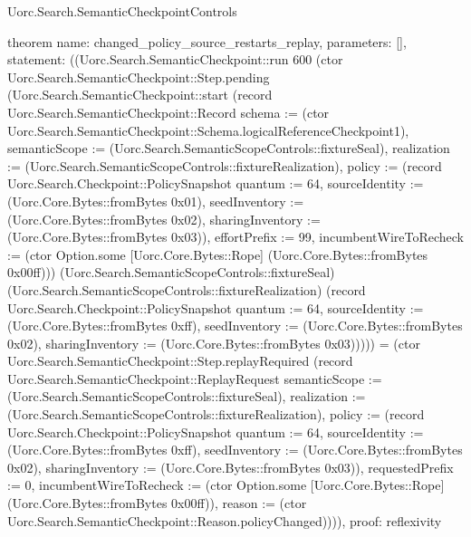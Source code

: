 \begin{lexlean}{Uorc.Search.SemanticCheckpointControls}
\begin{semanticmodule}
theorem{
  name: changed_policy_source_restarts_replay,
  parameters: [],
  statement: ((Uorc.Search.SemanticCheckpoint::run 600 (ctor Uorc.Search.SemanticCheckpoint::Step.pending (Uorc.Search.SemanticCheckpoint::start (record Uorc.Search.SemanticCheckpoint::Record {schema := (ctor Uorc.Search.SemanticCheckpoint::Schema.logicalReferenceCheckpoint1), semanticScope := (Uorc.Search.SemanticScopeControls::fixtureSeal), realization := (Uorc.Search.SemanticScopeControls::fixtureRealization), policy := (record Uorc.Search.Checkpoint::PolicySnapshot {quantum := 64, sourceIdentity := (Uorc.Core.Bytes::fromBytes 0x01), seedInventory := (Uorc.Core.Bytes::fromBytes 0x02), sharingInventory := (Uorc.Core.Bytes::fromBytes 0x03)}), effortPrefix := 99, incumbentWireToRecheck := (ctor Option.some [Uorc.Core.Bytes::Rope] (Uorc.Core.Bytes::fromBytes 0x00ff))}) (Uorc.Search.SemanticScopeControls::fixtureSeal) (Uorc.Search.SemanticScopeControls::fixtureRealization) (record Uorc.Search.Checkpoint::PolicySnapshot {quantum := 64, sourceIdentity := (Uorc.Core.Bytes::fromBytes 0xff), seedInventory := (Uorc.Core.Bytes::fromBytes 0x02), sharingInventory := (Uorc.Core.Bytes::fromBytes 0x03)})))) = (ctor Uorc.Search.SemanticCheckpoint::Step.replayRequired (record Uorc.Search.SemanticCheckpoint::ReplayRequest {semanticScope := (Uorc.Search.SemanticScopeControls::fixtureSeal), realization := (Uorc.Search.SemanticScopeControls::fixtureRealization), policy := (record Uorc.Search.Checkpoint::PolicySnapshot {quantum := 64, sourceIdentity := (Uorc.Core.Bytes::fromBytes 0xff), seedInventory := (Uorc.Core.Bytes::fromBytes 0x02), sharingInventory := (Uorc.Core.Bytes::fromBytes 0x03)}), requestedPrefix := 0, incumbentWireToRecheck := (ctor Option.some [Uorc.Core.Bytes::Rope] (Uorc.Core.Bytes::fromBytes 0x00ff)), reason := (ctor Uorc.Search.SemanticCheckpoint::Reason.policyChanged)}))),
  proof: reflexivity{}
}


\end{semanticmodule}
\end{lexlean}
